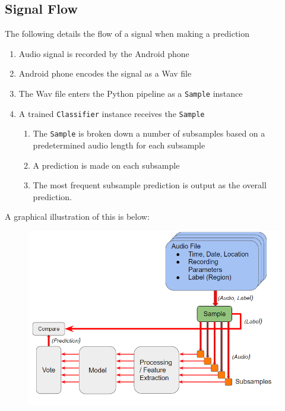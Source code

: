 \documentclass[journal]{IEEEtran}
\begin{document}
\subsection{Signal Flow}\label{Signal Flow}
The following details the flow of a signal when making a prediction
\begin{enumerate}
\item Audio signal is recorded by the Android phone
\item Android phone encodes the signal as a Wav file
\item The Wav file enters the Python pipeline as a \texttt{Sample} instance
\item A trained \texttt{Classifier} instance receives the \texttt{Sample}
\begin{enumerate}
\item The \texttt{Sample} is broken down a number of subsamples based on a predetermined audio length for each subsample
\item A prediction is made on each subsample
\item The most frequent subsample prediction is output as the overall prediction.
\end{enumerate}
\end{enumerate}
A graphical illustration of this is below:\\
\begin{figure}[H]
\centering
\includegraphics[width=0.9\linewidth]{pred_flow}
\end{figure}
\end{document}
